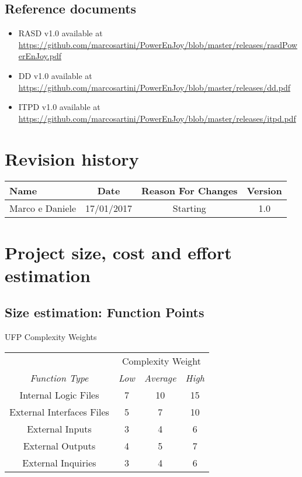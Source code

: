 \documentclass{scrreprt}
\newcommand{\fpvalues}[4]{%
	\textit{#1} & \textit{#2}& \textit{#3}& \textit{#4}\\\nopagebreak\hline
}
\newenvironment{fptable}[2]{
	\begin{center}
	#1
	\begin{longtable}{|c|c|c|c|}
	\hline 
	&
	\multicolumn{3}{|c|}{{#2}}\\\nopagebreak\hline	
}{
	\hline\end{longtable}\end{center}
}
\begin{document}
\section{Reference documents}
\begin{itemize}
\item RASD v1.0 available at \url{https://github.com/marcosartini/PowerEnJoy/blob/master/releases/rasdPowerEnJoy.pdf}
\item DD v1.0 available at \url{https://github.com/marcosartini/PowerEnJoy/blob/master/releases/dd.pdf}
\item ITPD v1.0 available at \url{https://github.com/marcosartini/PowerEnJoy/blob/master/releases/itpd.pdf}
\end{itemize}

\chapter*{Revision history}
\begin{center}
    \begin{tabular}{lccc}
        \toprule
	   \textbf{ Name }& \textbf{ Date  }& \textbf{ Reason For Changes }& \textbf{ Version}\\
        \midrule
	     Marco e Daniele & 17/01/2017 & Starting & 1.0\\
	\bottomrule
    \end{tabular}
\end{center}

\chapter{Project size, cost and effort estimation}

\section{Size estimation: Function Points}

\begin{fptable}{UFP Complexity Weights}{Complexity Weight}
\fpvalues{Function Type}{Low}{Average}{High}
Internal Logic Files & 7 & 10 & 15\\
External Interfaces Files & 5 & 7 & 10\\
External Inputs & 3 & 4 & 6\\
External Outputs & 4 & 5 & 7\\
External Inquiries & 3 & 4 & 6\\
\end{fptable}
\end{document}
